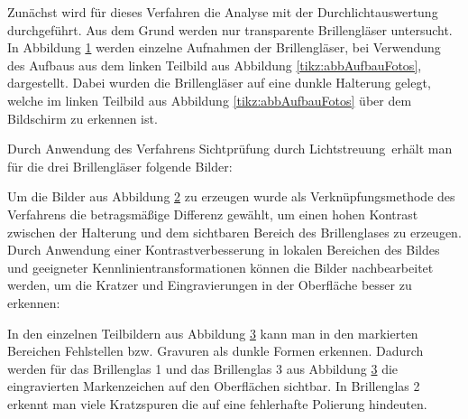 Zunächst wird für dieses Verfahren die Analyse mit der Durchlichtauswertung durchgeführt.
Aus dem Grund werden nur transparente Brillengläser untersucht.
In Abbildung \ref{tikz:abbStreifenaufnahmen} werden einzelne Aufnahmen der Brillengläser, bei Verwendung des Aufbaus aus dem linken Teilbild aus Abbildung \ref{tikz:abbAufbauFotos}, dargestellt.
Dabei wurden die Brillengläser auf eine dunkle Halterung gelegt, welche im linken Teilbild aus Abbildung \ref{tikz:abbAufbauFotos} über dem Bildschirm zu erkennen ist.

{
	\begin{figure}[H]
		\centering
		
		\label{tikz:abbStreifenaufnahmen}
	\end{figure}
}

\noindent
Durch Anwendung des Verfahrens \glqq Sichtprüfung durch Lichtstreuung\grqq ~erhält man für die drei Brillengläser folgende Bilder:

{
	\begin{figure}[H]
		\centering
		
		\label{tikz:abbCombinePatternPictures}
	\end{figure}
}

\noindent
Um die Bilder aus Abbildung \ref{tikz:abbCombinePatternPictures} zu erzeugen wurde als Verknüpfungsmethode des  Verfahrens die betragsmäßige Differenz gewählt, um einen hohen Kontrast zwischen der Halterung und dem sichtbaren Bereich des Brillenglases zu erzeugen.
Durch Anwendung einer Kontrastverbesserung in lokalen Bereichen des Bildes und geeigneter Kennlinientransformationen können die Bilder nachbearbeitet werden, um die Kratzer und Eingravierungen in der Oberfläche besser zu erkennen:

{
	\begin{figure}[H]
		\centering
		
		\label{tikz:abbNachbearbeitung}
	\end{figure}
}

\noindent
In den einzelnen Teilbildern aus Abbildung \ref{tikz:abbNachbearbeitung} kann man in den markierten Bereichen Fehlstellen bzw. Gravuren als dunkle Formen erkennen.
Dadurch werden für das Brillenglas 1 und das Brillenglas 3 aus Abbildung \ref{tikz:abbNachbearbeitung} die eingravierten Markenzeichen auf den Oberflächen sichtbar.
In Brillenglas 2 erkennt man viele Kratzspuren die auf eine fehlerhafte Polierung hindeuten.